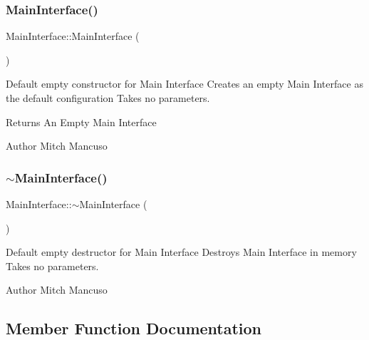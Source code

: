 \subsubsection{\texorpdfstring{Main\+Interface()}{MainInterface()}}
{\footnotesize\ttfamily Main\+Interface\+::\+Main\+Interface (\begin{DoxyParamCaption}{ }\end{DoxyParamCaption})}



Default empty constructor for Main Interface  Creates an empty Main Interface as the default configuration  Takes no parameters. 

\begin{DoxyReturn}{Returns}
An Empty Main Interface 
\end{DoxyReturn}
\begin{DoxyAuthor}{Author}
Mitch Mancuso 
\end{DoxyAuthor}
\mbox{\label{class_main_interface_a30816483adcca651a0a01a232749e8ea}} 
\subsubsection{\texorpdfstring{$\sim$\+Main\+Interface()}{~MainInterface()}}
{\footnotesize\ttfamily Main\+Interface\+::$\sim$\+Main\+Interface (\begin{DoxyParamCaption}{ }\end{DoxyParamCaption})}



Default empty destructor for Main Interface  Destroys Main Interface in memory  Takes no parameters. 

\begin{DoxyAuthor}{Author}
Mitch Mancuso 
\end{DoxyAuthor}


\subsection{Member Function Documentation}
\mbox{\label{class_main_interface_a8dcd81276003c4d4693115d89da573ca}} 
